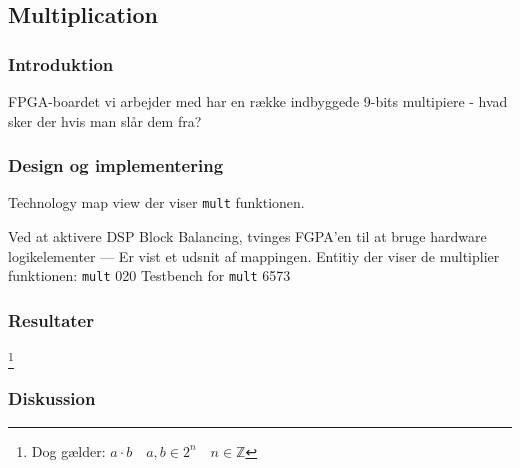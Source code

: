 \subsection{Multiplication}

\subsubsection{Introduktion}


FPGA-boardet vi arbejder med har en række indbyggede 9-bits multipiere - hvad sker der hvis man slår dem fra? 

\subsubsection{Design og implementering}




{Technology map view der viser \texttt{mult} funktionen.}


{Ved at aktivere DSP Block Balancing, tvinges FGPA'en til at bruge hardware logikelementer --- Er vist et udsnit af mappingen.}
{Entitiy der viser de multiplier funktionen: \texttt{mult}}
{0}{20}
{Testbench for \texttt{mult}}
{65}{73}

\subsubsection{Resultater}


\footnote{Dog gælder: $a\cdot b \quad a,b \in 2^n \quad n \in \mathbb{Z}$}
\subsubsection{Diskussion}


